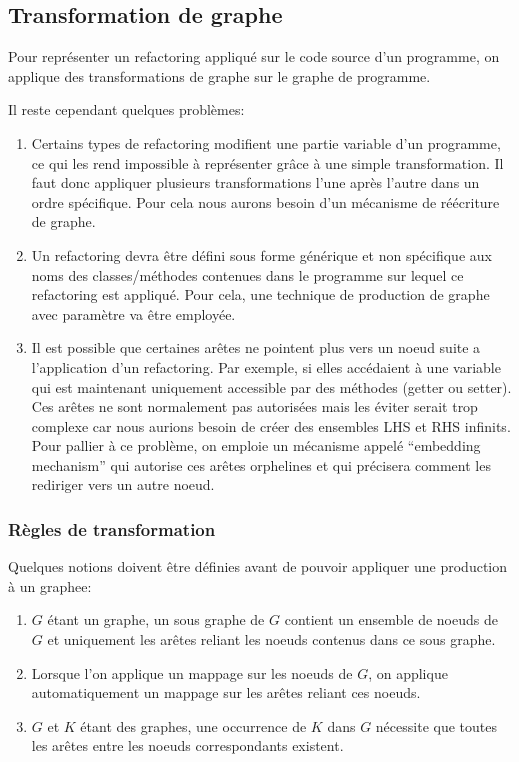 \documentclass[a4paper, 12pt]{article}
\begin{document}
  \subsection{Transformation de graphe}

  Pour représenter un refactoring appliqué sur le code source d'un programme, on applique des transformations de graphe sur le graphe de programme.

  Il reste cependant quelques problèmes:

  \begin{enumerate}
    \item Certains types de refactoring modifient une partie variable d'un programme, ce qui les rend impossible à représenter grâce à une simple transformation.
    Il faut donc appliquer plusieurs transformations l'une après l'autre dans un ordre spécifique. Pour cela nous aurons besoin d'un mécanisme de réécriture de graphe.

    \item Un refactoring devra être défini sous forme générique et non spécifique aux noms des classes/méthodes contenues dans le programme sur lequel ce refactoring est appliqué.
    Pour cela, une technique de production de graphe avec paramètre va être employée.

    \item Il est possible que certaines arêtes ne pointent plus vers un noeud suite a l'application d'un refactoring.
    Par exemple, si elles accédaient à une variable qui est maintenant uniquement accessible par des méthodes (getter ou setter).
    Ces arêtes ne sont normalement pas autorisées mais les éviter serait trop complexe car nous aurions besoin de créer des ensembles LHS et RHS infinits.
    Pour pallier à ce problème, on emploie un mécanisme appelé ``embedding mechanism'' qui autorise ces arêtes orphelines et qui précisera comment les rediriger vers un autre noeud.

  \end{enumerate}

  \subsubsection{Règles de transformation}

  Quelques notions doivent être définies avant de pouvoir appliquer une production à un graphee:

  \begin{enumerate}
    \item \(G\) étant un graphe, un sous graphe de \(G\) contient un ensemble de noeuds de \(G\) et uniquement les arêtes reliant les noeuds contenus dans ce sous graphe.

    \item Lorsque l'on applique un mappage sur les noeuds de \(G\), on applique automatiquement un mappage sur les arêtes reliant ces noeuds.

    \item \(G\) et \(K\) étant des graphes, une occurrence de \(K\) dans \(G\) nécessite que toutes les arêtes entre les noeuds correspondants existent.

  \end{enumerate}
\end{document}
